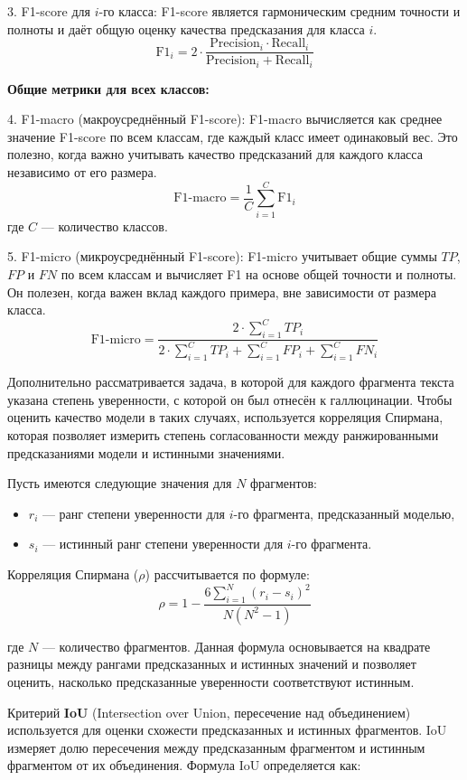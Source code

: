 \documentclass[12pt]{article}
\begin{document}
3. F1-score для \( i \)-го класса: F1-score является гармоническим средним точности и полноты и даёт общую оценку качества предсказания для класса \( i \).
\[
\text{F1}_i = 2 \cdot \frac{\text{Precision}_i \cdot \text{Recall}_i}{\text{Precision}_i + \text{Recall}_i}
\]

\textbf{Общие метрики для всех классов:}

4. F1-macro (макроусреднённый F1-score): F1-macro вычисляется как среднее значение F1-score по всем классам, где каждый класс имеет одинаковый вес. Это полезно, когда важно учитывать качество предсказаний для каждого класса независимо от его размера.
\[
\text{F1-macro} = \frac{1}{C} \sum_{i=1}^{C} \text{F1}_i
\]
где \( C \) — количество классов.

5. F1-micro (микроусреднённый F1-score): F1-micro учитывает общие суммы \( TP \), \( FP \) и \( FN \) по всем классам и вычисляет F1 на основе общей точности и полноты. Он полезен, когда важен вклад каждого примера, вне зависимости от размера класса.
\[
\text{F1-micro} = \frac{2 \cdot \sum_{i=1}^{C} TP_i}{2 \cdot \sum_{i=1}^{C} TP_i + \sum_{i=1}^{C} FP_i + \sum_{i=1}^{C} FN_i}
\]

Дополнительно рассматривается задача, в которой для каждого фрагмента текста указана степень уверенности, с которой он был отнесён к галлюцинации. Чтобы оценить качество модели в таких случаях, используется корреляция Спирмана, которая позволяет измерить степень согласованности между ранжированными предсказаниями модели и истинными значениями.

Пусть имеются следующие значения для $N$ фрагментов:
\begin{itemize}
    \item $r_i$ — ранг степени уверенности для $i$-го фрагмента, предсказанный моделью,
    \item $s_i$ — истинный ранг степени уверенности для $i$-го фрагмента.
\end{itemize}

Корреляция Спирмана (\( \rho \)) рассчитывается по формуле:
\[
\rho = 1 - \frac{6 \sum_{i=1}^{N} (r_i - s_i)^2}{N (N^2 - 1)}
\]

где $N$ — количество фрагментов. Данная формула основывается на квадрате разницы между рангами предсказанных и истинных значений и позволяет оценить, насколько предсказанные уверенности соответствуют истинным.

Критерий \textbf{IoU} (Intersection over Union, пересечение над объединением) используется для оценки схожести предсказанных и истинных фрагментов. IoU измеряет долю пересечения между предсказанным фрагментом и истинным фрагментом от их объединения. Формула IoU определяется как:
\end{document}
